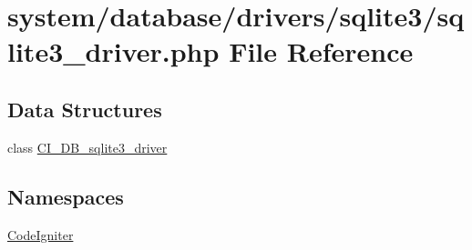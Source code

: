 \hypertarget{sqlite3__driver_8php}{}\section{system/database/drivers/sqlite3/sqlite3\+\_\+driver.php File Reference}
\label{sqlite3__driver_8php}
\subsection*{Data Structures}
\begin{DoxyCompactItemize}
\item 
class \mbox{\hyperlink{class_c_i___d_b__sqlite3__driver}{C\+I\+\_\+\+D\+B\+\_\+sqlite3\+\_\+driver}}
\end{DoxyCompactItemize}
\subsection*{Namespaces}
\begin{DoxyCompactItemize}
\item 
 \mbox{\hyperlink{namespace_code_igniter}{Code\+Igniter}}
\end{DoxyCompactItemize}
